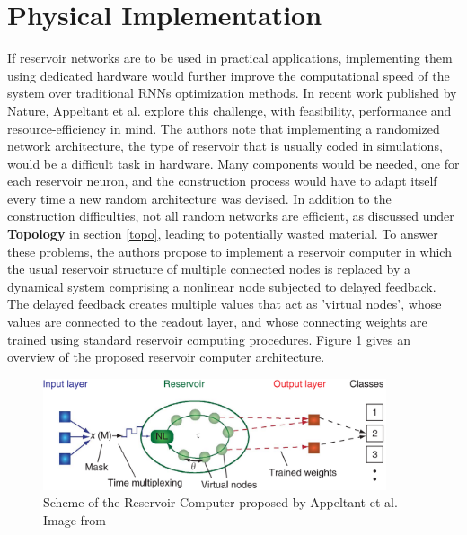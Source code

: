 \documentclass[12pt,oneside]{CUNY_CS_PhD}
\begin{document}
\section{Physical Implementation}
If reservoir networks are to be used in practical applications, implementing them using dedicated hardware would further improve the computational speed of the system over traditional RNNs optimization methods. In recent work published by Nature, Appeltant et al. \cite{appeltant2011information, appeltant_constructing_2014} 
explore this challenge, with feasibility, performance and resource-efficiency in mind. The authors note that implementing a randomized network architecture, the type of reservoir that is usually coded in simulations, would be a difficult task in hardware. Many components would be needed, one for each reservoir neuron, and the construction process would have to adapt itself every time a new random architecture was devised. In addition to the construction difficulties, not all random networks are efficient, as discussed under \textbf{Topology} in section \ref{topo}, leading to potentially wasted material. To answer these problems, the authors propose to implement a reservoir computer in which the usual reservoir structure of multiple connected nodes is replaced by a dynamical system comprising a nonlinear node subjected to delayed feedback. The delayed feedback creates multiple values that act as 'virtual nodes', whose values are connected to the readout layer, and whose connecting weights are trained using standard reservoir computing procedures. Figure \ref{fig:delayed_fb} gives an overview of the proposed reservoir computer architecture.
\begin{figure}[!htbp]
\centering
\includegraphics[width=0.9\textwidth]{pictures/delayed-feedback-res.png}
\caption{Scheme of the Reservoir Computer proposed by Appeltant et al. Image from \cite{appeltant2011information}}
\label{fig:delayed_fb}
\end{figure}\\
\end{document}
